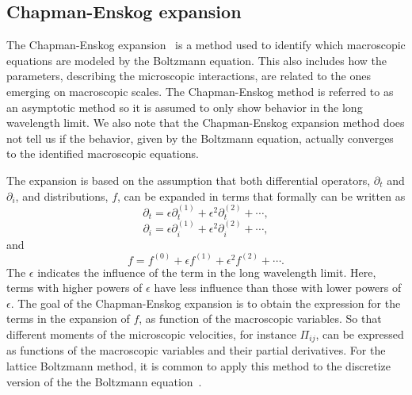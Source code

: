\documentclass[11pt,a4paper]{report}
\begin{document}
\subsection{Chapman-Enskog expansion}
\label{sec:chapman-enskog expansion}
The Chapman-Enskog expansion~\cite{chapman_mathematical_1990} is a method used to identify which macroscopic equations are modeled by the Boltzmann equation. This also includes how the parameters, describing the microscopic interactions, are related to the ones emerging on macroscopic scales. The Chapman-Enskog method is referred to as an asymptotic method so it is assumed to only show behavior in the long wavelength limit. We also note that the Chapman-Enskog expansion method does not tell us if the behavior, given by the Boltzmann equation, actually converges to the identified macroscopic equations.

The expansion is based on the assumption that both differential operators, $\partial_t$ and $\partial_i$, and distributions, $f$, can be expanded in terms that formally can be written as 
\begin{equation}\label{eq:epsilon partial_t}
\partial_t = \epsilon\partial^{(1)}_{t} + \epsilon^2\partial^{(2)}_{t} + \cdots,
\end{equation}
\begin{equation}\label{eq:epsilon partial_x}
\partial_i = \epsilon\partial^{(1)}_{i} + \epsilon^2\partial^{(2)}_{i} + \cdots,
\end{equation}
and
\begin{equation}\label{eq:epsilon f}
f = f^{(0)} + \epsilon f^{(1)} + \epsilon^2 f^{(2)} + \cdots.
\end{equation} 
The $\epsilon$ indicates the influence of the term in the long wavelength limit. Here, terms with higher powers of $\epsilon$ have less influence than those with lower powers of $\epsilon$.  The goal of the Chapman-Enskog expansion is to obtain the expression for the terms in the expansion of $f$, as function of the macroscopic variables. So that different moments of the microscopic velocities, for instance $\Pi_{ij}$, can be expressed as functions of the macroscopic variables and their partial derivatives. For the lattice Boltzmann method, it is common to apply this method to the discretize version of the the Boltzmann equation~\cite{kruger2017lattice, wolfram_cellular_1986}. 
\end{document}
